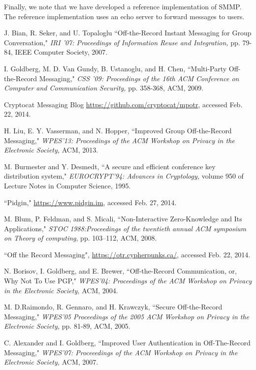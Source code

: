 \documentclass[%
preprint,
amsmath,amssymb,
aps,
prb,
floatfix,
]{revtex4-1}
\begin{document}
Finally, we note that we have developed a reference
implementation\cite{ref:referenceimplementation} of SMMP. The reference
implementation uses an echo server to forward messages to users.
\begin{thebibliography}{99}
 J. Bian, R. Seker, and U. Topaloglu ``Off-the-Record Instant
Messaging for Group Conversation," \textit{IRI '07: Proceedings of Information
Reuse and Integration,} pp. 79-84, IEEE Computer Society, 2007.

 I. Goldberg, M. D. Van Gundy, B. Ustanoglu, and H. Chen,
``Multi-Party Off-the-Record Messaging," \textit{CSS '09: Proceedings of the
16th ACM Conference on Computer and Communication Security,} pp. 358-368, ACM,
2009.

 Cryptocat Messaging Blog
\url{https://github.com/cryptocat/mpotr}, accessed Feb. 22, 2014.

 H. Liu, E. Y. Vasserman, and N. Hopper, ``Improved Group
Off-the-Record Messaging," \textit{WPES'13: Proceedings of the ACM Workshop on
Privacy in the Electronic Society,} ACM, 2013.

 M. Burmester and Y. Desmedt, ``A secure and efficient
conference key distribution system," \textit{EUROCRYPT'94: Advances in
Cryptology,} volume 950 of Lecture Notes in Computer Science, 1995.

 ``Pidgin," \url{https://www.pidgin.im}, accessed Feb. 27,
2014.

 M. Blum, P. Feldman, and S. Micali, ``Non-Interactive
Zero-Knowledge and Its Applications," \textit{ STOC 1988:Proceedings of the
twentieth annual ACM symposium on Theory of computing}, pp. 103–112, ACM, 2008.

 ``Off the Record Messaging",
\url{https://otr.cypherpunks.ca/}, accessed Feb. 22, 2014.

 N. Borisov, I. Goldberg, and E. Brewer, ``Off-the-Record
Communication, or, Why Not To Use PGP," \textit{WPES'04: Proceedings of the
ACM Workshop on Privacy in the Electronic Society,} ACM, 2004.

 M. D.Raimondo, R. Gennaro, and H. Krawczyk, ``Secure
Off-the-Record Messaging," \textit{WPES'05 Proceedings of the 2005 ACM Workshop
on Privacy in the Electronic Society,} pp. 81-89, ACM, 2005.

 C. Alexander and I. Goldberg, ``Improved User Authentication
in Off-The-Record Messaging," \textit{WPES'07: Proceeedings of the ACM Workshop
on Privacy in the Electronic Society,} ACM, 2007.


\end{thebibliography}
\end{document}
